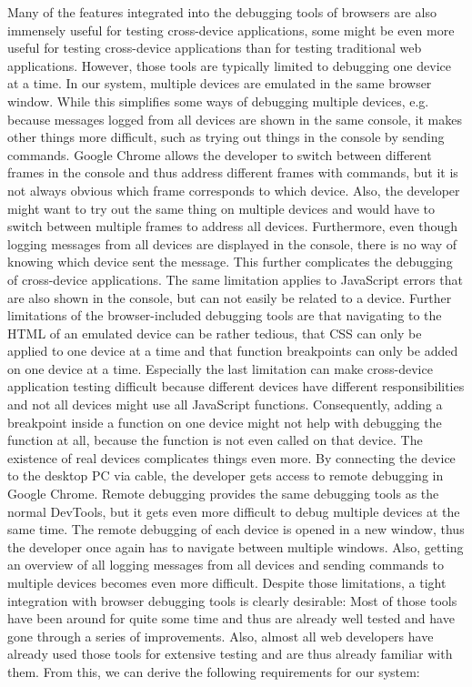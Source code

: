 Many of the features integrated into the debugging tools of browsers are also immensely useful for testing cross-device applications, some might be even more useful for testing cross-device applications than for testing traditional web applications. However, those tools are typically limited to debugging one device at a time. In our system, multiple devices are emulated in the same browser window. While this simplifies some ways of debugging multiple devices, e.g. because messages logged from all devices are shown in the same console, it makes other things more difficult, such as trying out things in the console by sending commands. Google Chrome allows the developer to switch between different frames in the console and thus address different frames with commands, but it is not always obvious which frame corresponds to which device. Also, the developer might want to try out the same thing on multiple devices and would have to switch between multiple frames to address all devices. Furthermore, even though logging messages from all devices are displayed in the console, there is no way of knowing which device sent the message. This further complicates the debugging of cross-device applications. The same limitation applies to JavaScript errors that are also shown in the console, but can not easily be related to a device. Further limitations of the browser-included debugging tools are that navigating to the HTML of an emulated device can be rather tedious, that CSS can only be applied to one device at a time and that function breakpoints can only be added on one device at a time. Especially the last limitation can make cross-device application testing difficult because different devices have different responsibilities and not all devices might use all JavaScript functions. Consequently, adding a breakpoint inside a function on one device might not help with debugging the function at all, because the function is not even called on that device. The existence of real devices complicates things even more. By connecting the device to the desktop PC via cable, the developer gets access to remote debugging in Google Chrome. Remote debugging provides the same debugging tools as the normal DevTools, but it gets even more difficult to debug multiple devices at the same time. The remote debugging of each device is opened in a new window, thus the developer once again has to navigate between multiple windows. Also, getting an overview of all logging messages from all devices and sending commands to multiple devices becomes even more difficult. Despite those limitations, a tight integration with browser debugging tools is clearly desirable: Most of those tools have been around for quite some time and thus are already well tested and have gone through a series of improvements. Also, almost all web developers have already used those tools for extensive testing and are thus already familiar with them. From this, we can derive the following requirements for our system:
